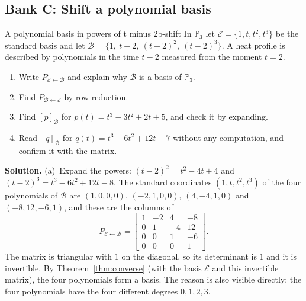 \documentclass[11pt]{article}
\begin{document}
\subsection*{Bank C: Shift a polynomial basis}
\begin{exmp}{A polynomial basis in powers of t minus 2}{b-shift}
In $\mathbb{P}_3$ let $\mathcal{E}=\{1,t,t^2,t^3\}$ be the standard basis and let $\mathcal{B}=\{1,\ t-2,\ (t-2)^2,\ (t-2)^3\}$. A heat profile is described by polynomials in the time $t-2$ measured from the moment $t=2$.
\begin{enumerate}
  \item[(a)] Write $P_{\mathcal{E}\leftarrow\mathcal{B}}$ and explain why $\mathcal{B}$ is a basis of $\mathbb{P}_3$.
  \item[(b)] Find $P_{\mathcal{B}\leftarrow\mathcal{E}}$ by row reduction.
  \item[(c)] Find $[p]_{\mathcal{B}}$ for $p(t)=t^3-3t^2+2t+5$, and check it by expanding.
  \item[(d)] Read $[q]_{\mathcal{B}}$ for $q(t)=t^3-6t^2+12t-7$ without any computation, and confirm it with the matrix.
\end{enumerate}

\textbf{Solution.}
(a)~Expand the powers: $(t-2)^2=t^2-4t+4$ and $(t-2)^3=t^3-6t^2+12t-8$. The standard coordinates $(1,t,t^2,t^3)$ of the four polynomials of $\mathcal{B}$ are $(1,0,0,0)$, $(-2,1,0,0)$, $(4,-4,1,0)$ and $(-8,12,-6,1)$, and these are the columns of
\[
P_{\mathcal{E}\leftarrow\mathcal{B}}=\begin{bmatrix}1&-2&4&-8\\0&1&-4&12\\0&0&1&-6\\0&0&0&1\end{bmatrix}.
\]
The matrix is triangular with $1$ on the diagonal, so its determinant is $1$ and it is invertible. By Theorem~\ref{thm:converse} (with the basis $\mathcal{E}$ and this invertible matrix), the four polynomials form a basis. The reason is also visible directly: the four polynomials have the four different degrees $0,1,2,3$.


\end{exmp}
\end{document}
